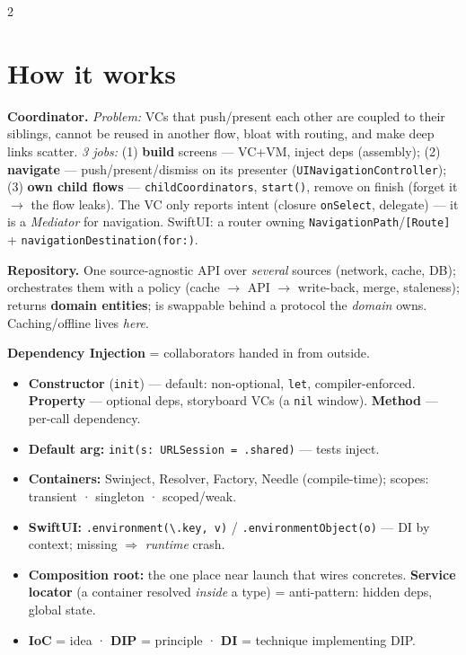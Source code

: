 \documentclass[8pt]{extarticle}
\begin{document}
\begin{multicols}{2}
\raggedright

\section{How it works}
\textbf{Coordinator.} \emph{Problem:} VCs that push/present each other are coupled to
their siblings, cannot be reused in another flow, bloat with routing, and make deep
links scatter. \emph{3 jobs:} (1) \textbf{build} screens — VC+VM, inject deps
(assembly); (2) \textbf{navigate} — push/present/dismiss on its presenter
(\texttt{UINavigationController}); (3) \textbf{own child flows} —
\texttt{childCoordinators}, \texttt{start()}, remove on finish (forget it $\to$ the flow leaks). The VC only reports
intent (closure \texttt{onSelect}, delegate) — it is a \emph{Mediator} for navigation.
SwiftUI: a router owning \texttt{NavigationPath}/\texttt{[Route]} +
\texttt{navigationDestination(for:)}.

\textbf{Repository.} One source-agnostic API over \emph{several} sources (network,
cache, DB); orchestrates them with a policy (cache $\to$ API $\to$ write-back, merge,
staleness); returns \textbf{domain entities}; is swappable behind a protocol the
\emph{domain} owns. Caching/offline lives \emph{here}.

\textbf{Dependency Injection} = collaborators handed in from outside.
\begin{itemize}
  \item \textbf{Constructor} (\texttt{init}) — default: non-optional, \texttt{let},
        compiler-enforced. \textbf{Property} — optional deps, storyboard VCs (a
        \texttt{nil} window). \textbf{Method} — per-call dependency.
  \item \textbf{Default arg:} \texttt{init(s: URLSession = .shared)} — tests inject.
  \item \textbf{Containers:} Swinject, Resolver, Factory, Needle (compile-time);
        scopes: transient · singleton · scoped/weak.
  \item \textbf{SwiftUI:} \texttt{.environment(\textbackslash.key, v)} /
        \texttt{.environmentObject(o)} — DI by context; missing $\Rightarrow$
        \emph{runtime} crash.
  \item \textbf{Composition root:} the one place near launch that wires concretes.
        \textbf{Service locator} (a container resolved \emph{inside} a type) =
        anti-pattern: hidden deps, global state.
  \item \textbf{IoC} = idea · \textbf{DIP} = principle · \textbf{DI} = technique implementing DIP.
\end{itemize}


\end{multicols}
\end{document}
